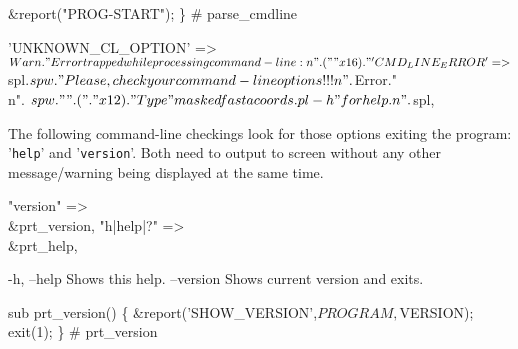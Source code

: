 \documentclass[11pt]{article}
\def\nwendcode{\endtrivlist \endgroup} %
\let\nwdocspar=\par                    %
\begin{document}
    &report("PROG-START");
\} # parse_cmdline
\nwendcode{}\nwdocspar

\nwenddocs{}\endmoddef
'UNKNOWN_CL_OPTION' =>
  $Warn."Error trapped while processing command-line:\\n".(" "x16)."\\%
'CMD_LINE_ERROR' =>
  $spl.$spw." Please, check your command-line options!!!\\n".$Error."\\n".
  $spw." ".("."x12)." Type \\"maskedfastacoords.pl -h\\" for help.\\n".$spl,
\nwendcode{}\nwdocspar


The following command-line checkings look for those options exiting the program: '{\tt{}help}' and '{\tt{}version}'. Both need to output to screen without any other message/warning being displayed at the same time.

\nwenddocs{}\endmoddef
"version"   => \\&prt_version, 
"h|help|?"  => \\&prt_help,
\nwendcode{}\nwdocspar
\nwenddocs{}\endmoddef
-h, --help            Shows this help.
--version             Shows current version and exits.
\nwendcode{}\nwdocspar

\nwenddocs{}\plusendmoddef
sub prt_version() \{
    &report('SHOW_VERSION',$PROGRAM,$VERSION);
    exit(1);
\} # prt_version
\nwendcode{}\nwdocspar
\end{document}

